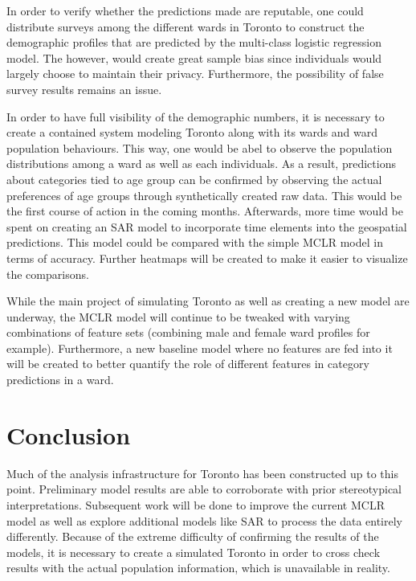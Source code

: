 \documentclass[12pt]{article}
\begin{document}
   In order to verify whether the predictions made are reputable, one could distribute surveys among the different wards in Toronto to construct the demographic profiles that are predicted by the multi-class logistic regression model. The however, would create great sample bias since individuals would largely choose to maintain their privacy. Furthermore, the possibility of false survey results remains an issue.

   In order to have full visibility of the demographic numbers, it is necessary to create a contained system modeling Toronto along with its wards and ward population behaviours. This way, one would be abel to observe the population distributions among a ward as well as each individuals. As a result, predictions about categories tied to age group can be confirmed by observing the actual preferences of age groups through synthetically created raw data. This would be the first course of action in the coming months. Afterwards, more time would be spent on creating an SAR model to incorporate time elements into the geospatial predictions. This model could be compared with the simple MCLR model in terms of accuracy. Further heatmaps will be created to make it easier to visualize the comparisons. 

   While the main project of simulating Toronto as well as creating a new model are underway, the MCLR model will continue to be tweaked with varying combinations of feature sets (combining male and female ward profiles for example). Furthermore, a new baseline model where no features are fed into it will be created to better quantify the role of different features in category predictions in a ward. 

   \section{Conclusion}

   Much of the analysis infrastructure for Toronto has been constructed up to this point. Preliminary model results are able to corroborate with prior stereotypical interpretations. Subsequent work will be done to improve the current MCLR model as well as explore additional models like SAR to process the data entirely differently. Because of the extreme difficulty of confirming the results of the models, it is necessary to create a simulated Toronto in order to cross check results with the actual population information, which is unavailable in reality. 


\newpage
\printbibliography
\end{document}
